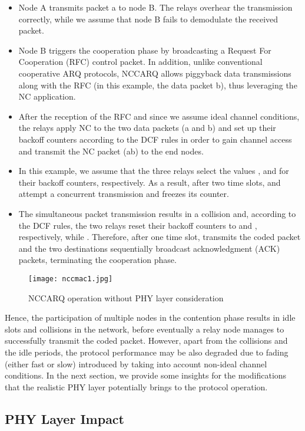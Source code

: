 \documentclass[12pt,draftcls, onecolumn]{IEEEtran}
\begin{document}
\begin{itemize}
  \item Node A transmits packet a to node B. The relays overhear the transmission correctly, while we assume that node B fails to demodulate the received packet.
  \item Node B triggers the cooperation phase by broadcasting a Request For Cooperation (RFC) control packet. In addition, unlike conventional cooperative ARQ protocols, NCCARQ allows piggyback data transmissions along with the RFC (in this example, the data packet b), thus leveraging the NC application.
  \item After the reception of the RFC and since we assume ideal channel conditions, the relays apply NC to the two data packets (a and b) and set up their backoff counters according to the DCF rules in order to gain channel access and transmit the NC packet (ab) to the end nodes.
  \item In this example, we assume that the three relays select the values ,  and  for their backoff counters, respectively. As a result, after two time slots,  and  attempt a concurrent transmission and  freezes its counter.
  \item The simultaneous packet transmission results in a collision and, according to the DCF rules, the two relays reset their backoff counters to  and , respectively, while . Therefore, after one time slot,  transmits the coded packet and the two destinations sequentially broadcast acknowledgment (ACK) packets, terminating the cooperation phase.
\end{itemize}


\begin{figure}[htb]
\centering
\texttt{[image: nccmac1.jpg]}
\caption{NCCARQ operation without PHY layer consideration}\label{nccmac}
\end{figure}

Hence, the participation of multiple nodes in the contention phase results in idle slots and collisions in the network, before eventually a relay node manages to successfully transmit the coded packet. However, apart from the collisions and the idle periods, the protocol performance may be also degraded due to fading (either fast or slow) introduced by taking into account non-ideal channel conditions. In the next section, we provide some insights for the modifications that the realistic PHY layer potentially brings to the protocol operation.

\subsection{PHY Layer Impact}
\label{sec:phy}
\end{document}
